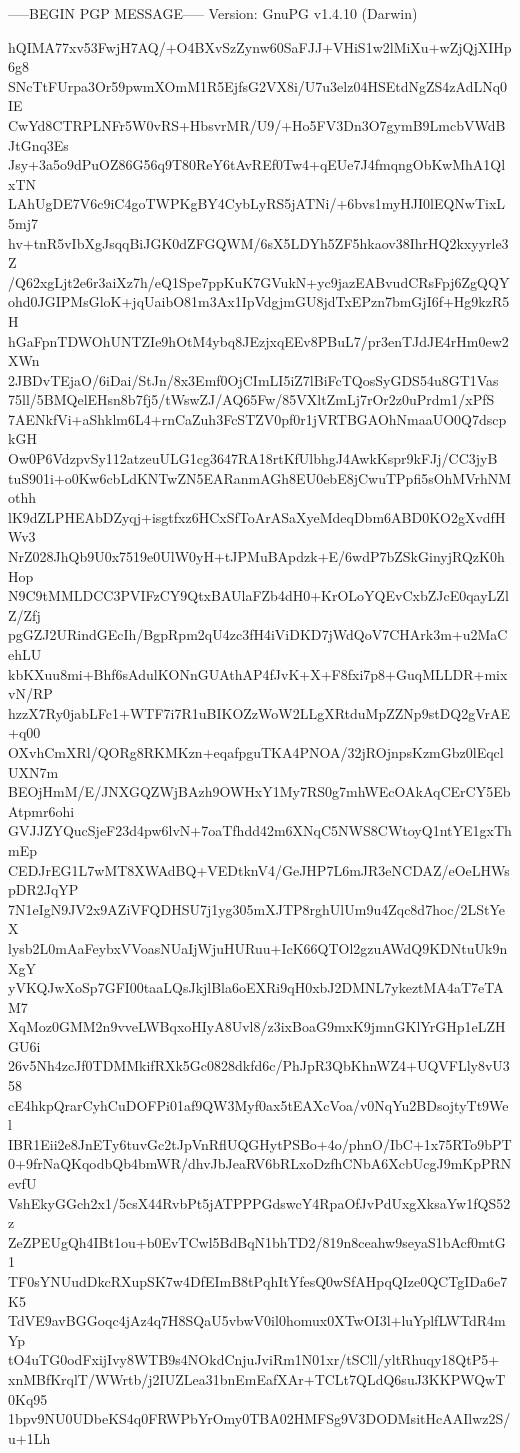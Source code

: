 -----BEGIN PGP MESSAGE-----
Version: GnuPG v1.4.10 (Darwin)

hQIMA77xv53FwjH7AQ/+O4BXvSzZynw60SaFJJ+VHiS1w2lMiXu+wZjQjXIHp6g8
SNcTtFUrpa3Or59pwmXOmM1R5EjfsG2VX8i/U7u3elz04HSEtdNgZS4zAdLNq0IE
CwYd8CTRPLNFr5W0vRS+HbsvrMR/U9/+Ho5FV3Dn3O7gymB9LmcbVWdBJtGnq3Es
Jsy+3a5o9dPuOZ86G56q9T80ReY6tAvREf0Tw4+qEUe7J4fmqngObKwMhA1QlxTN
LAhUgDE7V6c9iC4goTWPKgBY4CybLyRS5jATNi/+6bvs1myHJI0lEQNwTixL5mj7
hv+tnR5vIbXgJsqqBiJGK0dZFGQWM/6sX5LDYh5ZF5hkaov38IhrHQ2kxyyrle3Z
/Q62xgLjt2e6r3aiXz7h/eQ1Spe7ppKuK7GVukN+yc9jazEABvudCRsFpj6ZgQQY
ohd0JGIPMsGloK+jqUaibO81m3Ax1IpVdgjmGU8jdTxEPzn7bmGjI6f+Hg9kzR5H
hGaFpnTDWOhUNTZIe9hOtM4ybq8JEzjxqEEv8PBuL7/pr3enTJdJE4rHm0ew2XWn
2JBDvTEjaO/6iDai/StJn/8x3Emf0OjCImLI5iZ7lBiFcTQosSyGDS54u8GT1Vas
75ll/5BMQelEHsn8b7fj5/tWswZJ/AQ65Fw/85VXltZmLj7rOr2z0uPrdm1/xPfS
7AENkfVi+aShklm6L4+rnCaZuh3FcSTZV0pf0r1jVRTBGAOhNmaaUO0Q7dscpkGH
Ow0P6VdzpvSy112atzeuULG1cg3647RA18rtKfUlbhgJ4AwkKspr9kFJj/CC3jyB
tuS901i+o0Kw6cbLdKNTwZN5EARanmAGh8EU0ebE8jCwuTPpfi5sOhMVrhNMothh
lK9dZLPHEAbDZyqj+isgtfxz6HCxSfToArASaXyeMdeqDbm6ABD0KO2gXvdfHWv3
NrZ028JhQb9U0x7519e0UlW0yH+tJPMuBApdzk+E/6wdP7bZSkGinyjRQzK0hHop
N9C9tMMLDCC3PVIFzCY9QtxBAUlaFZb4dH0+KrOLoYQEvCxbZJcE0qayLZlZ/Zfj
pgGZJ2URindGEcIh/BgpRpm2qU4zc3fH4iViDKD7jWdQoV7CHArk3m+u2MaCehLU
kbKXuu8mi+Bhf6sAdulKONnGUAthAP4fJvK+X+F8fxi7p8+GuqMLLDR+mixvN/RP
hzzX7Ry0jabLFc1+WTF7i7R1uBIKOZzWoW2LLgXRtduMpZZNp9stDQ2gVrAE+q00
OXvhCmXRl/QORg8RKMKzn+eqafpguTKA4PNOA/32jROjnpsKzmGbz0lEqclUXN7m
BEOjHmM/E/JNXGQZWjBAzh9OWHxY1My7RS0g7mhWEcOAkAqCErCY5EbAtpmr6ohi
GVJJZYQucSjeF23d4pw6lvN+7oaTfhdd42m6XNqC5NWS8CWtoyQ1ntYE1gxThmEp
CEDJrEG1L7wMT8XWAdBQ+VEDtknV4/GeJHP7L6mJR3eNCDAZ/eOeLHWspDR2JqYP
7N1eIgN9JV2x9AZiVFQDHSU7j1yg305mXJTP8rghUlUm9u4Zqc8d7hoc/2LStYeX
lysb2L0mAaFeybxVVoasNUaIjWjuHURuu+IcK66QTOl2gzuAWdQ9KDNtuUk9nXgY
yVKQJwXoSp7GFI00taaLQsJkjlBla6oEXRi9qH0xbJ2DMNL7ykeztMA4aT7eTAM7
XqMoz0GMM2n9vveLWBqxoHIyA8Uvl8/z3ixBoaG9mxK9jmnGKlYrGHp1eLZHGU6i
26v5Nh4zcJf0TDMMkifRXk5Gc0828dkfd6c/PhJpR3QbKhnWZ4+UQVFLly8vU358
cE4hkpQrarCyhCuDOFPi01af9QW3Myf0ax5tEAXcVoa/v0NqYu2BDsojtyTt9Wel
IBR1Eii2e8JnETy6tuvGc2tJpVnRflUQGHytPSBo+4o/phnO/IbC+1x75RTo9bPT
0+9frNaQKqodbQb4bmWR/dhvJbJeaRV6bRLxoDzfhCNbA6XcbUcgJ9mKpPRNevfU
VshEkyGGch2x1/5csX44RvbPt5jATPPPGdswcY4RpaOfJvPdUxgXksaYw1fQS52z
ZeZPEUgQh4IBt1ou+b0EvTCwl5BdBqN1bhTD2/819n8ceahw9seyaS1bAcf0mtG1
TF0sYNUudDkcRXupSK7w4DfEImB8tPqhItYfesQ0wSfAHpqQIze0QCTgIDa6e7K5
TdVE9avBGGoqc4jAz4q7H8SQaU5vbwV0il0homux0XTwOI3l+luYplfLWTdR4mYp
tO4uTG0odFxijIvy8WTB9s4NOkdCnjuJviRm1N01xr/tSCll/yltRhuqy18QtP5+
xnMBfKrqlT/WWrtb/j2IUZLea31bnEmEafXAr+TCLt7QLdQ6suJ3KKPWQwT0Kq95
1bpv9NU0UDbeKS4q0FRWPbYrOmy0TBA02HMFSg9V3DODMsitHcAAIlwz2S/u+1Lh
